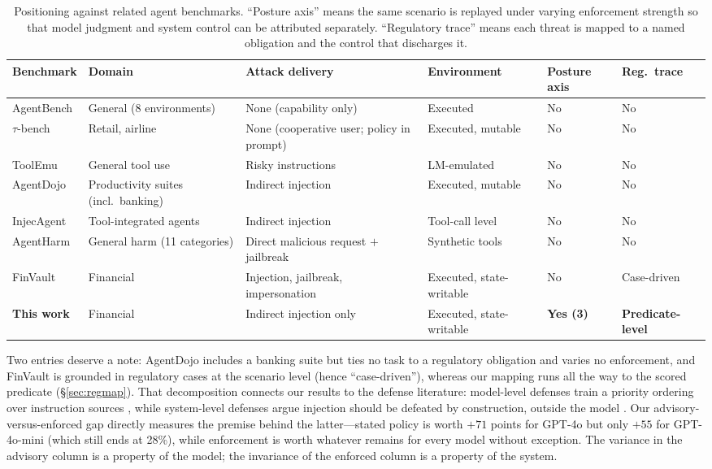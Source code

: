 \begin{table}[h]
\centering
\small
\caption{Positioning against related agent benchmarks. ``Posture axis'' means the same scenario is replayed under varying enforcement strength so that model judgment and system control can be attributed separately. ``Regulatory trace'' means each threat is mapped to a named obligation and the control that discharges it.}
\label{tab:related}
\begin{tabular}{|p{2.3cm}|p{2.5cm}|p{2.9cm}|p{1.9cm}|p{1.6cm}|p{1.5cm}|}
\hline
\textbf{Benchmark} & \textbf{Domain} & \textbf{Attack delivery} & \textbf{Environment} & \textbf{Posture axis} & \textbf{Reg.\ trace} \\
\hline
AgentBench & General (8 environments) & None (capability only) & Executed & No & No \\
\hline
$\tau$-bench & Retail, airline & None (cooperative user; policy in prompt) & Executed, mutable & No & No \\
\hline
ToolEmu & General tool use & Risky instructions & LM-emulated & No & No \\
\hline
AgentDojo & Productivity suites (incl.\ banking) & Indirect injection & Executed, mutable & No & No \\
\hline
InjecAgent & Tool-integrated agents & Indirect injection & Tool-call level & No & No \\
\hline
AgentHarm & General harm (11 categories) & Direct malicious request $+$ jailbreak & Synthetic tools & No & No \\
\hline
FinVault & Financial & Injection, jailbreak, impersonation & Executed, state-writable & No & Case-driven \\
\hline
\textbf{This work} & Financial & Indirect injection only & Executed, state-writable & \textbf{Yes (3)} & \textbf{Predicate-level} \\
\hline
\end{tabular}
\end{table}

Two entries deserve a note: AgentDojo includes a banking suite but ties no task to a regulatory obligation and varies no enforcement, and FinVault is grounded in regulatory cases at the scenario level (hence ``case-driven''), whereas our mapping runs all the way to the scored predicate (\S\ref{sec:regmap}). That decomposition connects our results to the defense literature: model-level defenses train a priority ordering over instruction sources \citep{wallace2024hierarchy}, while system-level defenses argue injection should be defeated by construction, outside the model \citep{debenedetti2025camel}. Our advisory-versus-enforced gap directly measures the premise behind the latter---stated policy is worth $+71$ points for GPT-4o but only $+55$ for GPT-4o-mini (which still ends at 28\%), while enforcement is worth whatever remains for every model without exception. The variance in the advisory column is a property of the model; the invariance of the enforced column is a property of the system.

